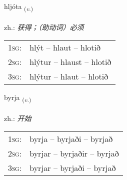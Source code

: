 \documentclass[frontgrid, backgrid]{flacards}\usepackage[]{graphicx}\usepackage[]{xcolor}
\begin{document}
\renewcommand{\blhead}{\vskip5pt {\small\bfseries\footnotesize Sagnorð | 动词 }}
\renewcommand{\bcfoot}{\vskip5pt \hspace{2pt}{\small\bfseries\footnotesize 1K}}


{hljóta \small{\textsubscript{(\textit{v.})}} \\[1ex] %
\textphonetic{[l̥jouːta]} \\
zh.: \emph{获得；（助动词）必须} \\  [2ex]
\renewcommand*{\arraystretch}{0.8}
\begin{tabular}{p{1cm}l}
\textsc{1sg}: & hlýt -- hlaut -- hlotið \\ 
\textsc{2sg}: & hlýtur -- hlaust -- hlotið \\ 
\textsc{3sg}: & hlýtur -- hlaut -- hlotið \\ 
\end{tabular}
}

\renewcommand{\flhead}{\vskip5pt \fboxsep=0pt {\small\bfseries\footnotesize Sagnorð | 动词}}
\renewcommand{\fcfoot}{\vskip5pt \fboxsep=0pt \hspace{2pt}{\small\bfseries\footnotesize 1K}}

\renewcommand{\blhead}{\vskip5pt {\small\bfseries\footnotesize Sagnorð | 动词 }}
\renewcommand{\bcfoot}{\vskip5pt \hspace{2pt}{\small\bfseries\footnotesize 1K}}


{byrja \small{\textsubscript{(\textit{v.})}} \\[1ex] %
\textphonetic{[pɪrja]} \\
zh.: \emph{开始} \\  [2ex]
\renewcommand*{\arraystretch}{0.8}
\begin{tabular}{p{1cm}l}
\textsc{1sg}: & byrja -- byrjaði -- byrjað \\ 
\textsc{2sg}: & byrjar -- byrjaðir -- byrjað \\ 
\textsc{3sg}: & byrjar -- byrjaði -- byrjað \\ 
\end{tabular}
}
\end{document}

